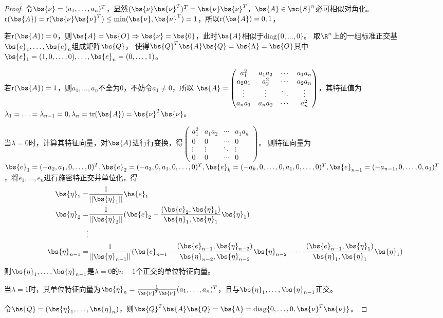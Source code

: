 \documentclass[12pt, a4paper, oneside, UTF8]{ctexbook}
\begin{document}
\begin{proof}
    令$\bs{\nu}=(a_1,\ldots,a_n)^T$，显然$(\bs{\nu}\bs{\nu}^T)^T=\bs{\nu}\bs{\nu}^T$，$\bs{A} \in \mc{S}^n$必可相似对角化。
    $\mathrm{r}(\bs{A})=\mathrm{r}(\bs{\nu}\bs{\nu}^T) \leq \min(\mathrm{\bs{\nu},\mathrm{\bs{\nu}^T}})=1$，所以$\mathrm{r}(\bs{A})=0,1$，
    
    若$\mathrm{r}(\bs{A})=0$，则$\bs{A}=\bs{O} \Rightarrow \bs{\nu}=\bs{0}$，此时$\bs{A}$相似于$\mathrm{diag}\{0,\ldots,0\}$。
    取$\R^n$上的一组标准正交基$\bs{e}_1,\ldots,\bs{e}_n$组成矩阵$\bs{Q}$，
    使得$\bs{Q}^T\bs{A}\bs{Q}=\bs{\Lambda}=\bs{O}$其中$\bs{e}_1=(1,0,\ldots,0),\ldots,\bs{e}_n=(0,\ldots,1)$。

    若$\mathrm{r}(\bs{A})=1$，则$a_1,\ldots,a_n$不全为0，不妨令$a_1 \neq 0$，所以
    $\bs{A}=\begin{pmatrix}
        a_1^2& a_1a_2 & \cdots & a_1a_n \\
        a_2a_1 & a_2^2 &\cdots & a_2a_n\\
        \vdots &\vdots & \ddots & \vdots \\
        a_na_1& a_na_2&\cdots  & a_n^2 
    \end{pmatrix}$，其特征值为$\lambda_1=\ldots=\lambda_{n-1}=0,\lambda_n=\mathrm{tr}(\bs{A})=\bs{\nu}^T\bs{\nu}$。
    
    当$\lambda=0$时，计算其特征向量，对$\bs{A}$进行行变换，得$\begin{pmatrix}
        a_1^2 & a_1a_2 &\cdots &a_1a_n \\
        0 &0 &\cdots & 0 \\
        \vdots &\vdots & \ddots& \vdots \\
        0 &0 &\cdots &0 
    \end{pmatrix}$，
    则特征向量为$\bs{e}_1=(-a_2,a_1,0,\ldots,0)^T,\bs{e}_2=(-a_3,0,a_1,0,\ldots,0)^T,\bs{e}_k=(-a_k,0,\ldots,0,a_1,0,\ldots,0)^T,
    \bs{e}_{n-1}=(-a_{n-1},0,\ldots,0,a_1)^T$，将$e_1,\ldots,e_n$进行施密特正交并单位化，得
    \begin{align*}
        \bs{\eta}_1=&\frac{1}{||\bs{\eta}_1||} \bs{e}_1 \\
        \bs{\eta}_2=&\frac{1}{||\bs{\eta}_2||}(\bs{e}_2-\frac{(\bs{e}_2,\bs{\eta}_1)}{\bs{\eta}_1,\bs{\eta}_1} \bs{\eta}_1) \\
        \vdots& \\
        \bs{\eta}_{n-1}=&\frac{1}{||\bs{\eta}_{n-1}||}(\bs{e}_{n-1}-\frac{(\bs{e}_{n-1},\bs{\eta}_{n-2})}{\bs{\eta}_{n-2},\bs{\eta}_{n-2}} \bs{\eta}_{n-2}-\cdots\frac{(\bs{e}_{n-1},\bs{\eta}_1)}{\bs{\eta}_1,\bs{\eta}_1} \bs{\eta}_1)
    \end{align*}
    则$\bs{\eta}_1,\ldots,\bs{\eta}_{n-1}$是$\lambda=0$的$n-1$个正交的单位特征向量。

    当$\lambda=1$时，其单位特征向量为$\bs{\eta}_n=\frac{1}{\bs{\nu}^T\bs{\nu}}(a_1,\ldots,a_n)^T$，且与$\bs{\eta}_1,\ldots,\bs{\eta}_{n-1}$正交。

    令$\bs{Q}=(\bs{\eta}_1,\ldots,\bs{\eta}_{n})$，则$\bs{Q}^T\bs{A}\bs{Q}=\bs{\Lambda}=\mathrm{diag}\{0,\ldots,0,\bs{\nu}^T\bs{\nu}\}$。
\end{proof}
\end{document}
